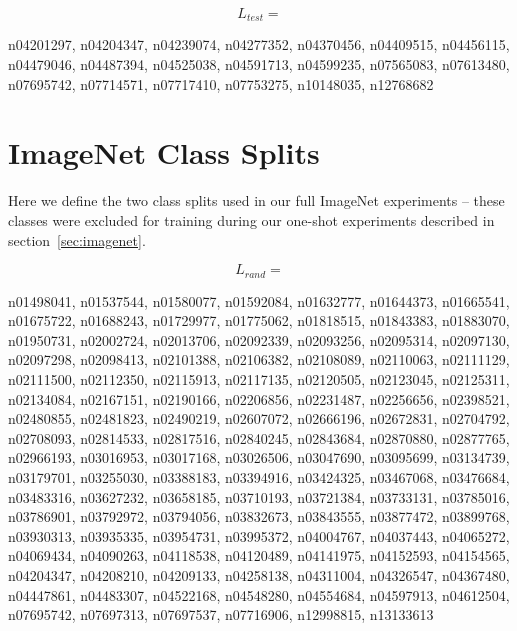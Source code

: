 $$L_{test}=$${\scriptsize n04201297, n04204347, n04239074, n04277352, n04370456, n04409515, n04456115, n04479046, n04487394, n04525038, n04591713, n04599235, n07565083, n07613480, n07695742, n07714571, n07717410, n07753275, n10148035, n12768682
\par
}

\section{ImageNet Class Splits}
Here we define the two class splits used in our full ImageNet experiments -- these classes were excluded for training during our one-shot experiments described in section~\ref{sec:imagenet}.

$$L_{rand}=$${\scriptsize n01498041, n01537544, n01580077, n01592084, n01632777, n01644373, n01665541, n01675722, n01688243, n01729977, n01775062, n01818515, n01843383, n01883070, n01950731, n02002724, n02013706, n02092339, n02093256, n02095314, n02097130, n02097298, n02098413, n02101388, n02106382, n02108089, n02110063, n02111129, n02111500, n02112350, n02115913, n02117135, n02120505, n02123045, n02125311, n02134084, n02167151, n02190166, n02206856, n02231487, n02256656, n02398521, n02480855, n02481823, n02490219, n02607072, n02666196, n02672831, n02704792, n02708093, n02814533, n02817516, n02840245, n02843684, n02870880, n02877765, n02966193, n03016953, n03017168, n03026506, n03047690, n03095699, n03134739, n03179701, n03255030, n03388183, n03394916, n03424325, n03467068, n03476684, n03483316, n03627232, n03658185, n03710193, n03721384, n03733131, n03785016, n03786901, n03792972, n03794056, n03832673, n03843555, n03877472, n03899768, n03930313, n03935335, n03954731, n03995372, n04004767, n04037443, n04065272, n04069434, n04090263, n04118538, n04120489, n04141975, n04152593, n04154565, n04204347, n04208210, n04209133, n04258138, n04311004, n04326547, n04367480, n04447861, n04483307, n04522168, n04548280, n04554684, n04597913, n04612504, n07695742, n07697313, n07697537, n07716906, n12998815, n13133613
\par
}

